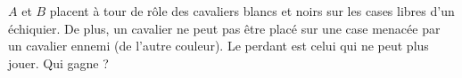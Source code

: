 $A$ et $B$ placent à tour de rôle des cavaliers blancs et noirs sur les cases libres d'un échiquier. De plus, un cavalier ne peut pas être placé sur une case menacée par un cavalier ennemi (de l'autre couleur). Le perdant est celui qui ne peut plus jouer. Qui gagne ?
